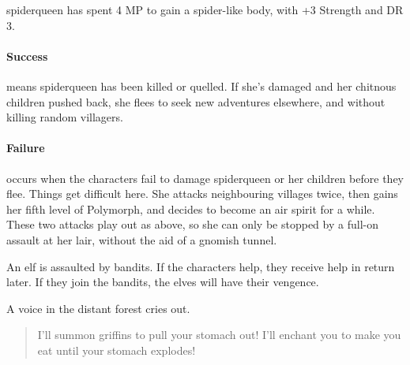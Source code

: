 \begin{multicols}{2}
\gnomishillusionist


\gnome


\gnome

\label{spiderqueen}


\Gls{spiderqueen} has spent 4 MP to gain a spider-like body, with +3 Strength and DR 3.

\chitincrawler

\paragraph{Success} means \gls{spiderqueen} has been killed or quelled.
If she's damaged and her chitnous children pushed back, she flees to seek new adventures elsewhere, and without killing random villagers.

\paragraph{Failure} occurs when the characters fail to damage \gls{spiderqueen} or her children before they flee.
Things get difficult here.
She attacks neighbouring villages twice, then gains her fifth level of Polymorph, and decides to become an air spirit for a while.
These two attacks play out as above, so she can only be stopped by a full-on assault at her lair, without the aid of a gnomish tunnel.

\label{littleprince}

\sqminitoc

An elf is assaulted by bandits.
If the characters help, they receive help in return later.
If they join the bandits, the elves will have their vengence.


\begin{boxtext}
	A voice in the distant forest cries out.
	\begin{quote}
		I'll summon griffins to pull your stomach out!  I'll enchant you to make you eat until your stomach explodes!
	\end{quote}


\end{boxtext}
\end{multicols}
